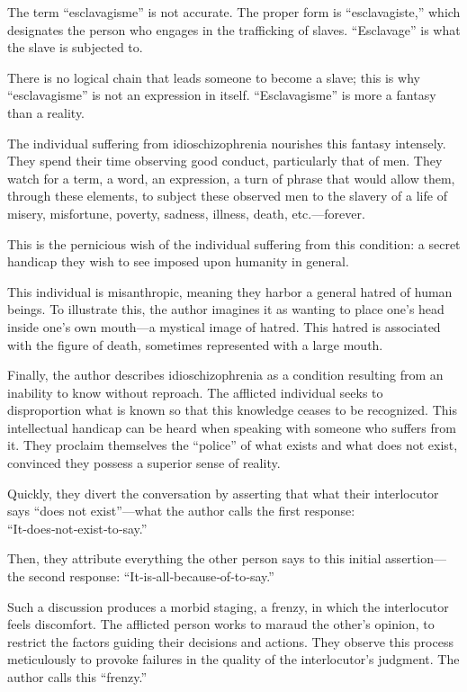 \documentclass[12pt,oneside]{article}
\begin{document}
The term “esclavagisme” is not accurate. The proper form is “esclavagiste,” which designates the person who engages in the trafficking of slaves. “Esclavage” is what the slave is subjected to.

There is no logical chain that leads someone to become a slave; this is why “esclavagisme” is not an expression in itself. “Esclavagisme” is more a fantasy than a reality.

The individual suffering from idioschizophrenia nourishes this fantasy intensely. They spend their time observing good conduct, particularly that of men. They watch for a term, a word, an expression, a turn of phrase that would allow them, through these elements, to subject these observed men to the slavery of a life of misery, misfortune, poverty, sadness, illness, death, etc.—forever.

This is the pernicious wish of the individual suffering from this condition: a secret handicap they wish to see imposed upon humanity in general.

This individual is misanthropic, meaning they harbor a general hatred of human beings. To illustrate this, the author imagines it as wanting to place one’s head inside one’s own mouth—a mystical image of hatred. This hatred is associated with the figure of death, sometimes represented with a large mouth.

Finally, the author describes idioschizophrenia as a condition resulting from an inability to know without reproach. The afflicted individual seeks to disproportion what is known so that this knowledge ceases to be recognized. This intellectual handicap can be heard when speaking with someone who suffers from it. They proclaim themselves the “police” of what exists and what does not exist, convinced they possess a superior sense of reality.

Quickly, they divert the conversation by asserting that what their interlocutor says “does not exist”—what the author calls the first response: “It‑does‑not‑exist‑to‑say.”

Then, they attribute everything the other person says to this initial assertion—the second response: “It‑is‑all‑because‑of‑to‑say.”

Such a discussion produces a morbid staging, a frenzy, in which the interlocutor feels discomfort. The afflicted person works to maraud the other’s opinion, to restrict the factors guiding their decisions and actions. They observe this process meticulously to provoke failures in the quality of the interlocutor’s judgment. The author calls this “frenzy.”
\end{document}
